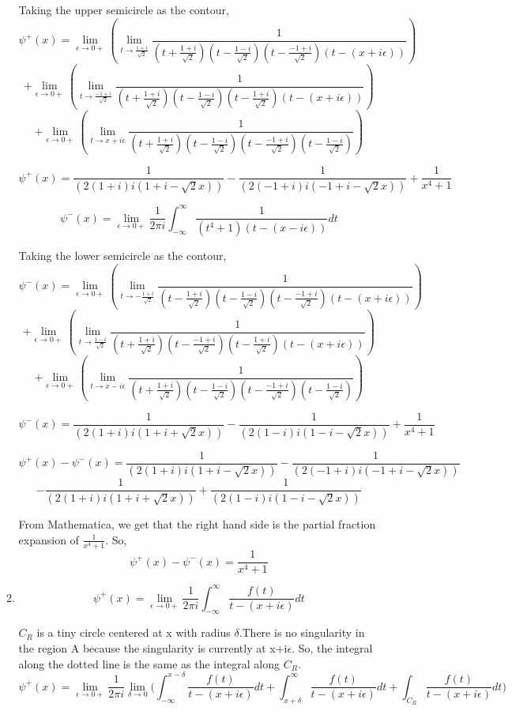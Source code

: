 \documentclass[a4paper]{article}
\begin{document}
\begin{enumerate}
\begin{enumerate}
  		Taking the upper semicircle as the contour,
    		\[\psi^{+}(x)=\lim_{\epsilon \to 0+} (\lim_{t \to \frac{1+i}{\sqrt{2}}} \frac{1}{(t+\frac{1+i}{\sqrt{2}})(t-\frac{1-i}{\sqrt{2}})(t-\frac{-1+i}{\sqrt{2}})(t - (x+i\epsilon))})\]	
   	\[+\lim_{\epsilon \to 0+} (\lim_{t \to \frac{-1+i}{\sqrt{2}}} \frac{1}{(t+\frac{1+i}{\sqrt{2}})(t-\frac{1-i}{\sqrt{2}})(t-\frac{1+i}{\sqrt{2}})(t - (x+i\epsilon))})\]
   	\[+\lim_{\epsilon \to 0+} (\lim_{t \to x+i\epsilon} \frac{1}{(t+\frac{1+i}{\sqrt{2}})(t-\frac{1-i}{\sqrt{2}})(t-\frac{-1+i}{\sqrt{2}})(t-\frac{1-i}{\sqrt{2}})})\]    									
   	
   	\[\psi^{+}(x)= \frac{1}{(2(1+i)i(1+i-\sqrt{2}x))}-\frac{1}{(2(-1+i)i(-1+i-\sqrt{2}x))} +\frac{1}{x^4+1}\]
   	
 		\[\psi^{-}(x)=\lim_{\epsilon \to 0+}\frac{1}{2\pi i}\int_{-\infty}^\infty \frac{1}{(t^4+1)(t - (x-i\epsilon))}dt\]
 		
 		Taking the lower semicircle as the contour,
 		\[\psi^{-}(x)=\lim_{\epsilon \to 0+} (\lim_{t \to -\frac{1+i}{\sqrt{2}}} \frac{1}{(t-\frac{1+i}{\sqrt{2}})(t-\frac{1-i}{\sqrt{2}})(t-\frac{-1+i}{\sqrt{2}})(t - (x+i\epsilon))})\]	
 		\[+\lim_{\epsilon \to 0+} (\lim_{t \to \frac{1-i}{\sqrt{2}}} \frac{1}{(t+\frac{1+i}{\sqrt{2}})(t-\frac{-1+i}{\sqrt{2}})(t-\frac{1+i}{\sqrt{2}})(t - (x+i\epsilon))})\]
 		\[+\lim_{\epsilon \to 0+} (\lim_{t \to x-i\epsilon} \frac{1}{(t+\frac{1+i}{\sqrt{2}})(t-\frac{1-i}{\sqrt{2}})(t-\frac{-1+i}{\sqrt{2}})(t-\frac{1-i}{\sqrt{2}})})\]    									
 		
 		\[\psi^{-}(x)= \frac{1}{(2(1+i)i(1+i+\sqrt{2}x))}-\frac{1}{(2(1-i)i(1-i-\sqrt{2}x))} +\frac{1}{x^4+1}\]  
 		
 		\[\psi^{+}(x)-\psi^{-}(x)=	\frac{1}{(2(1+i)i(1+i-\sqrt{2}x))}-\frac{1}{(2(-1+i)i(-1+i-\sqrt{2}x))} \]
 		\[- \frac{1}{(2(1+i)i(1+i+\sqrt{2}x))}+\frac{1}{(2(1-i)i(1-i-\sqrt{2}x))} \]
 
From Mathematica, we get that the right hand side is the partial fraction expansion of $\frac{1}{x^4+1}$. So,	
 \[\psi^{+}(x)-\psi^{-}(x)= \frac{1}{x^4+1}\] 	
\item
		\[\psi^{+}(x)= \lim_{\epsilon \to 0+} \frac{1}{2\pi i} \int_{-\infty}^\infty \frac{f(t)}{t - (x+i\epsilon)}dt \] 
		\vspace{30mm}
		
		$C_R$ is a tiny circle centered at x with radius $\delta$.There is no singularity in the region A because the singularity is currently at x+i$\epsilon$. So, the integral along the dotted line is the same as the integral along $C_R$.
		\[\psi^{+}(x)=	\lim_{\epsilon \to 0+} \frac{1}{2\pi i}\lim_{\delta\to 0} \big(\int_{-\infty}^{x-\delta} \frac{f(t)}{t - (x+i\epsilon)}dt +\int_{x+\delta}^\infty \frac{f(t)}{t - (x+i\epsilon)}dt + \int_{C_R} \frac{f(t)}{t - (x+i\epsilon)}dt \big)\]
				

\end{enumerate}
\end{enumerate}
\end{document}
